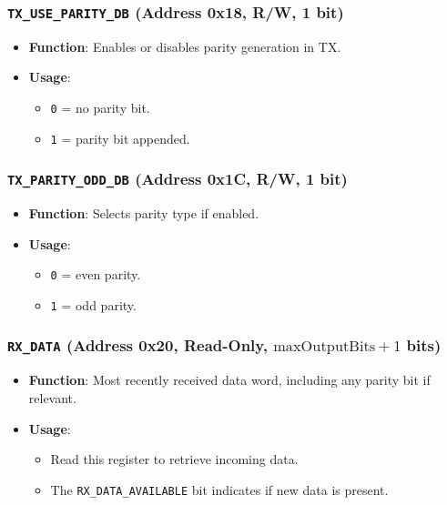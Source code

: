 \subsubsection{\texttt{TX\_USE\_PARITY\_DB} (Address 0x18, R/W, 1 bit)}
\begin{itemize}[noitemsep]
\item \textbf{Function}: Enables or disables parity generation in TX.
\item \textbf{Usage}: 
  \begin{itemize}[noitemsep]
  \item \texttt{0} = no parity bit.
  \item \texttt{1} = parity bit appended.
  \end{itemize}
\end{itemize}

\subsubsection{\texttt{TX\_PARITY\_ODD\_DB} (Address 0x1C, R/W, 1 bit)}
\begin{itemize}[noitemsep]
\item \textbf{Function}: Selects parity type if enabled.
\item \textbf{Usage}: 
  \begin{itemize}[noitemsep]
  \item \texttt{0} = even parity.
  \item \texttt{1} = odd parity.
  \end{itemize}
\end{itemize}

\subsubsection{\texttt{RX\_DATA} (Address 0x20, Read-Only, \(\text{maxOutputBits}+1\) bits)}
\begin{itemize}[noitemsep]
\item \textbf{Function}: Most recently received data word, including any parity bit if relevant.
\item \textbf{Usage}:
  \begin{itemize}[noitemsep]
  \item Read this register to retrieve incoming data.
  \item The \texttt{RX\_DATA\_AVAILABLE} bit indicates if new data is present.
  \end{itemize}
\end{itemize}

